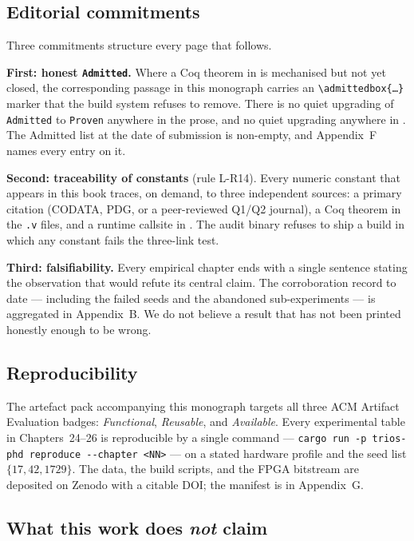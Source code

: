 \subsection*{Editorial commitments}

Three commitments structure every page that follows.

\textbf{First: honest \texttt{Admitted}.} Where a Coq theorem in
 is mechanised but not yet closed,
the corresponding passage in this monograph carries an
\texttt{\textbackslash admittedbox\{\ldots\}} marker that the build
system refuses to remove. There is no quiet upgrading of
\texttt{Admitted} to \texttt{Proven} anywhere in the prose, and no
quiet upgrading anywhere in
. The Admitted list at the
date of submission is non-empty, and Appendix~F names every entry on
it.

\textbf{Second: traceability of constants} (rule L-R14). Every numeric
constant that appears in this book traces, on demand, to three
independent sources: a primary citation (CODATA, PDG, or a
peer-reviewed Q1/Q2 journal), a Coq theorem in the \texttt{.v} files,
and a runtime callsite in . The audit
binary refuses to ship a build in which any constant fails the
three-link test.

\textbf{Third: falsifiability.} Every empirical chapter ends with a
single sentence stating the observation that would refute its central
claim. The corroboration record to date --- including the failed
seeds and the abandoned sub-experiments --- is aggregated in
Appendix~B. We do not believe a result that has not been printed
honestly enough to be wrong.

\subsection*{Reproducibility}

The artefact pack accompanying this monograph targets all three ACM
Artifact Evaluation badges: \emph{Functional}, \emph{Reusable}, and
\emph{Available}. Every experimental table in Chapters~24--26 is
reproducible by a single command --- \verb|cargo run -p trios-phd reproduce --chapter <NN>|
--- on a stated hardware profile and the seed list \(\{17, 42, 1729\}\).
The data, the build scripts, and the FPGA bitstream are deposited on
Zenodo with a citable DOI; the manifest is in Appendix~G.

\subsection*{What this work does \emph{not} claim}

